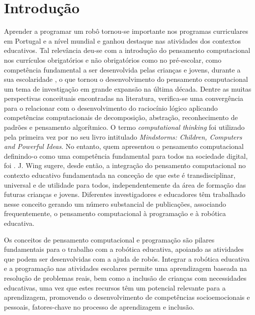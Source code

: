 \documentclass[portuguese]{textolivre}
\begin{document}
\section{Introdução}
Aprender a programar um robô tornou-se importante nos programas curriculares em Portugal e a nível mundial e ganhou destaque nas atividades dos contextos educativos. Tal relevância deu-se com a introdução do pensamento computacional nos currículos obrigatórios e não obrigatórios como no pré-escolar, como competência fundamental a ser desenvolvida pelas crianças e jovens, durante a sua escolaridade \cite{bers_coding_2017,kafai_computational_2017,loureiro_educational_2023,loureiro_robotica_2022,ramos_introducao_2022,resnick_coding_2020,valente_pensamento_2019}, o que tornou o desenvolvimento do pensamento computacional um tema de investigação em grande expansão na última década. Dentre as muitas perspectivas conceituais encontradas na literatura, verifica-se uma convergência para o relacionar com o desenvolvimento do raciocínio lógico aplicando competências computacionais de decomposição, abstração, reconhecimento de padrões e pensamento algorítmico. O termo \textit{computational thinking} foi utilizado pela primeira vez por \textcite{papert_mindstorms:_1993} no seu livro intitulado \textit{Mindstorms: Children, Computers and Powerful Ideas}. No entanto, quem apresentou o pensamento computacional definindo-o como uma competência fundamental para todos na sociedade digital, foi \textcite{wing_computational_2006}. J. Wing sugere, desde então, a integração do pensamento computacional no contexto educativo fundamentada na conceção de que este é transdisciplinar, universal e de utilidade para todos, independentemente da área de formação das futuras crianças e jovens. Diferentes investigadores e educadores têm trabalhado nesse conceito gerando um número substancial de publicações, associando frequentemente, o pensamento computacional à programação \cite{bers_blocks_2008,bers_coding_2018,bers_coding_2019,kafai_computational_2016} e à robótica educativa.

Os conceitos de pensamento computacional e programação são pilares fundamentais para o trabalho com a robótica educativa, apoiando as atividades que podem ser desenvolvidas com a ajuda de robôs. Integrar a robótica educativa e a programação nas atividades escolares permite uma aprendizagem baseada na resolução de problemas reais, bem como a inclusão de crianças com necessidades educativas, uma vez que estes recursos têm um potencial relevante para a aprendizagem, promovendo o desenvolvimento de competências socioemocionais e pessoais, fatores-chave no processo de aprendizagem e inclusão.
\end{document}

